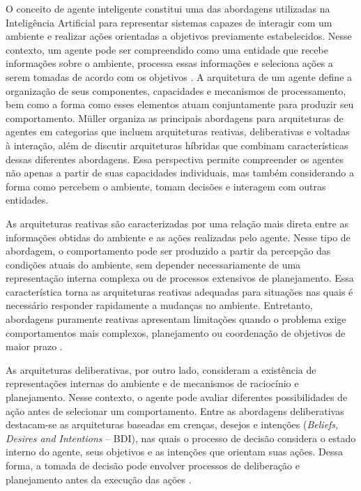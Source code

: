 O conceito de agente inteligente constitui uma das abordagens utilizadas na Inteligência Artificial para representar sistemas capazes de interagir com um ambiente e realizar ações orientadas a objetivos previamente estabelecidos. Nesse contexto, um agente pode ser compreendido como uma entidade que recebe informações sobre o ambiente, processa essas
informações e seleciona ações a serem tomadas de acordo com os objetivos \cite{muller1999}.
A arquitetura de um agente define a organização de seus componentes,
capacidades e mecanismos de processamento, bem como a forma como esses
elementos atuam conjuntamente para produzir seu comportamento. Müller
\cite{muller1999} organiza as principais abordagens para arquiteturas de
agentes em categorias que incluem arquiteturas reativas, deliberativas e
voltadas à interação, além de discutir arquiteturas híbridas que combinam
características dessas diferentes abordagens. Essa perspectiva permite
compreender os agentes não apenas a partir de suas capacidades individuais,
mas também considerando a forma como percebem o ambiente, tomam decisões e
interagem com outras entidades.

As arquiteturas reativas são caracterizadas por uma relação mais direta
entre as informações obtidas do ambiente e as ações realizadas pelo agente.
Nesse tipo de abordagem, o comportamento pode ser produzido a partir da
percepção das condições atuais do ambiente, sem depender necessariamente de
uma representação interna complexa ou de processos extensivos de
planejamento. Essa característica torna as arquiteturas reativas adequadas
para situações nas quais é necessário responder rapidamente a mudanças no
ambiente. Entretanto, abordagens puramente reativas apresentam limitações
quando o problema exige comportamentos mais complexos, planejamento ou
coordenação de objetivos de maior prazo \cite{muller1999}.

As arquiteturas deliberativas, por outro lado, consideram a existência de
representações internas do ambiente e de mecanismos de raciocínio e
planejamento. Nesse contexto, o agente pode avaliar diferentes possibilidades
de ação antes de selecionar um comportamento. Entre as abordagens
deliberativas destacam-se as arquiteturas baseadas em crenças, desejos e
intenções (\textit{Beliefs, Desires and Intentions} -- BDI), nas quais o
processo de decisão considera o estado interno do agente, seus objetivos e
as intenções que orientam suas ações. Dessa forma, a tomada de decisão pode
envolver processos de deliberação e planejamento antes da execução das ações
\cite{muller1999}.

